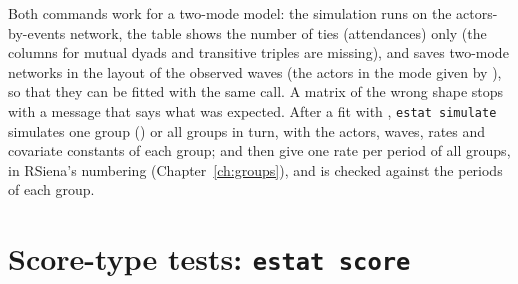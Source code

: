 Both commands work for a two-mode model: the simulation runs on the actors-by-events network, the table shows the number of ties (attendances) only (the columns for mutual dyads and transitive triples are missing), and  saves two-mode networks in the layout of the observed waves (the actors in the mode given by ), so that they can be fitted with the same call. A  matrix of the wrong shape stops with a message that says what was expected. After a fit with , \texttt{estat simulate} simulates one group () or all groups in turn, with the actors, waves, rates and covariate constants of each group;  and  then give one rate per period of all groups, in RSiena's numbering (Chapter~\ref{ch:groups}), and  is checked against the periods of each group.

\section{Score-type tests: \texttt{estat score}}

